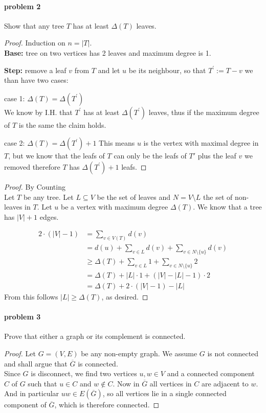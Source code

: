 \paragraph{problem 2} 
Show that any tree $ T $ has at least $ \Delta(T) $ leaves. 
\begin{proof}
Induction on $ n = |T| $.
\\
\textbf{Base:} tree on two vertices has 2 leaves and maximum degree is 1.

\smallskip \noindent 
\textbf{Step:} remove a leaf $v$ from $T$ and let $u$ be its neighbour,
so that $ T^\prime := T - v $ we than have two cases:

\smallskip \noindent
case 1: $ \Delta(T) = \Delta(T^\prime) $ \\
We know by I.H. that $ T^\prime $ has at least $ \Delta(T^\prime) $ leaves, thus 
if the maximum degree of $ T $ is the same the claim holds.

\bigskip \noindent
case 2: $ \Delta(T) = \Delta(T^\prime) + 1 $
This means $ u $ is the vertex with maximal degree in $T$, but we know that the
leafs of $T$ can only be the leafs of $T'$ plus the leaf $ v $ we removed
therefore $ T $ has $ \Delta(T^\prime) + 1 $ leafs.

\end{proof}
\begin{proof} By Counting $ $ \\
Let $ T $ be any tree. Let $ L \subseteq V $ be the set of leaves and 
$ N = V \setminus L $ the set of non-leaves in $ T $. Let $ u $ be a vertex 
with maximum degree $ \Delta(T) $. We know that a tree has $ |V| + 1 $ edges.

\begin{align}
    2 \cdot (|V| - 1) &= \sum_{v \in V(T)} d(v) \\
    &= d(u) + \sum_{v \in L} d(v) + \sum_{v \in N \setminus \{u\}} d(v) \\
    &\geq \Delta(T) + \sum_{v \in L} 1 + \sum_{v \in N \setminus \{u\}} 2 \\
    &= \Delta(T) + |L| \cdot 1 + (|V| - |L| - 1) \cdot 2  \\
    &= \Delta(T) + 2 \cdot (|V| - 1) - |L|
\end{align}
From this follows $ |L| \geq \Delta(T) $, as desired.
\end{proof}

\paragraph{problem 3}
Prove that either a graph or its complement is connected.
\begin{proof}
    Let $ G = (V,E) $ be any non-empty graph. We assume $G$ is not connected and 
    shall argue that $ \overline{G} $ is connected. \\
    Since $G$ is disconnect, we find two vertices $ u,w \in V $ and a connected
    component $ C $ of $ G $ such that $ u \in C $ and $ w \notin C $. Now in 
    $ \overline{G} $ all vertices in $ C $ are adjacent to $ w $. And in 
    particular $uw\in E(\overline{G})$, so all vertices lie in a single 
    connected component of $ \overline{G} $, which is therefore connected.
\end{proof}


